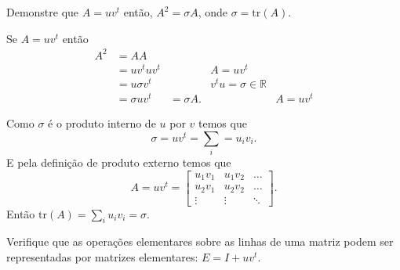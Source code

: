 \begin{questions}
    \question Demonstre que $A = u v^t$ ent\~{a}o, $A^2 = \sigma A$, onde $\sigma = \mbox{tr}(A)$.
    \begin{solution}
        Se $A = u v^t$ ent\~{a}o
        \begin{align*}
            A^2 &= A A \\
            &= u v^t u v^t && A = u v^t \\
            &= u \sigma v^t && v^t u = \sigma \in \mathbb{R} \\
            &= \sigma u v^t
            &= \sigma A. && A = u v^t
        \end{align*}

        Como $\sigma$ \'{e} o produto interno de $u$ por $v$ temos que
        \[
        \sigma = u v^t = \sum_i = u_i v_i.
        \]
        E pela defini\c{c}\~{a}o de produto externo temos que
        \[
        A = u v^t = \begin{bmatrix}
            u_1 v_1 & u_1 v_2 & \ldots \\
            u_2 v_1 & u_2 v_2 & \ldots \\
            \vdots & \vdots & \ddots
        \end{bmatrix}.
        \]
        Ent\~{a}o $\mbox{tr}(A) = \sum_i u_i v_i = \sigma$.

    \end{solution}

    \question Verifique que as opera\c{c}\~{o}es elementares sobre as linhas de uma matriz podem ser representadas por matrizes elementares: $E = I + u v^t$.
    \begin{parts}

\end{parts}
\end{questions}
